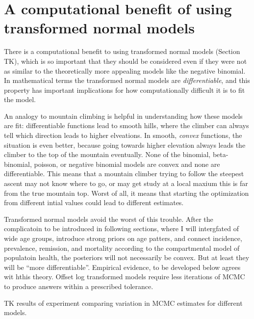 \section{A computational benefit of using transformed normal models}

There is a computational benefit to using transformed normal models
(Section TK), which is so important that they should be considered
even if they were not as similar to the theoretically more appealing
models like the negative binomial.  In mathematical terms the
transformed normal models are \emph{differentiable}, and this property
has important implications for how computationally difficult it is to
fit the model.

An analogy to mountain climbing is helpful in understanding how these
models are fit: differentiable functions lead to smooth hills, where
the climber can always tell which direction leads to higher
elveations.  In smooth, \emph{convex} functions, the situation is even
better, because going towards higher elevation always leads the
climber to the top of the mountain eventually.  None of the binomial,
beta-binomial, poisson, or negative binomial models are convex and
none are differentiable.  This means that a mountain climber trying to
follow the steepest ascent may not know where to go, or may get study
at a local maxium this is far from the true mountain top.  Worst of
all, it means that starting the optimization from different intial
values could lead to different estimates.

Transformed normal models avoid the worst of this trouble.  After the
complicatoin to be introduced in following sections, where I will
intergfated of wide age groups, introduce strong priors on age
patters, and connect incidence, prevalence, remission, and mortality
according to the compartmental model of populatoin health, the
posteriors will not necessarily be convex.  But at least they will be
``more differentiable''.  Empirical evidence, to be developed below
agrees wit hthis theory.  Offset log transformed models require less
iterations of MCMC to produce answers within a prescribed tolerance.

TK results of experiment comparing variation in MCMC estimates for
different models.
